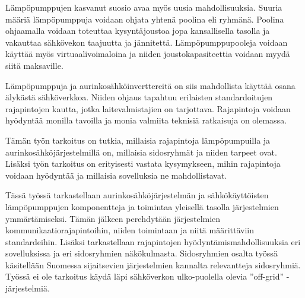 Lämpöpumppujen kasvanut suosio avaa myös uusia mahdollisuuksia. Suuria määriä lämpöpumppuja voidaan ohjata yhtenä poolina eli ryhmänä. Poolina ohjaamalla voidaan toteuttaa kysyntäjoustoa jopa kansallisella tasolla ja vakauttaa sähkövekon taajuutta ja jännitettä. Lämpöpumppupooleja voidaan käyttää myös virtuaalivoimaloina ja niiden joustokapasiteettia voidaan myydä siitä maksaville\parencite{ShenJiangLi, fischerTriebelSelinger}.

Lämpöpumppuja ja aurinkosähköinverttereitä on siis mahdollista käyttää osana älykästä sähköverkkoa. Niiden ohjaus tapahtuu erilaisten standardoitujen rajapintojen kautta, jotka laitevalmistajien on tarjottava. Rajapintoja voidaan hyödyntää monilla tavoilla ja monia valmiita teknisiä ratkaisuja on olemassa.

Tämän työn tarkoitus on tutkia, millaisia rajapintoja lämpöpumpuilla ja aurinkosähköjärjestelmillä on, millaisia sidosryhmät ja niiden tarpeet ovat. Lisäksi työn tarkoitus on erityisesti vastata kysymykseen, mihin rajapintoja voidaan hyödyntää ja millaisia sovelluksia ne mahdollistavat.

Tässä työssä tarkastellaan aurinkosähköjärjestelmän ja sähkökäyttöisten lämpöpumppujen komponentteja ja toimintaa yleisellä tasolla järjestelmien ymmärtämiseksi. Tämän jälkeen perehdytään järjestelmien kommunikaatiorajapintoihin, niiden toimintaan ja niitä määrittäviin standardeihin. Lisäksi tarkastellaan rajapintojen hyödyntämismahdollisuuksia eri sovelluksissa ja eri sidosryhmien näkökulmasta. Sidosryhmien osalta työssä käsitellään Suomessa sijaitsevien järjestelmien kannalta relevantteja sidosryhmiä. Työssä ei ole tarkoitus käydä läpi sähköverkon ulko-puolella olevia ”off-grid” -järjestelmiä.
